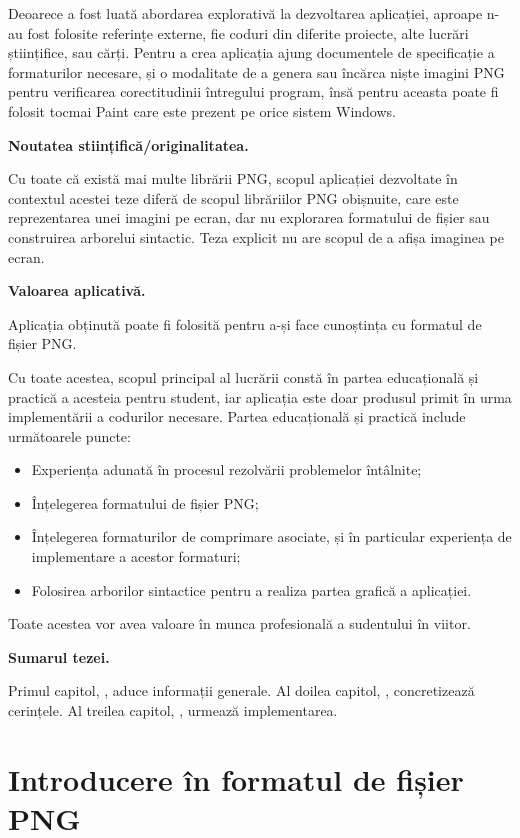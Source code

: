 \documentclass[a4paper,12pt]{report}
\begin{document}
Deoarece a fost luată abordarea explorativă la dezvoltarea aplicației,
aproape n-au fost folosite referințe externe,
fie coduri din diferite proiecte, alte lucrări științifice, sau cărți.
Pentru a crea aplicația ajung documentele de specificație a formaturilor necesare,
și o modalitate de a genera sau încărca niște imagini \ac{PNG}
pentru verificarea corectitudinii întregului program,
însă pentru aceasta poate fi folosit tocmai Paint care este prezent pe orice sistem Windows.

\textbf{Noutatea stiințifică/originalitatea.}

Cu toate că există mai multe librării \ac{PNG},
scopul aplicației dezvoltate în contextul acestei teze diferă de scopul librăriilor \ac{PNG} obișnuite,
care este reprezentarea unei imagini pe ecran,
dar nu explorarea formatului de fișier sau construirea arborelui sintactic.
Teza explicit nu are scopul de a afișa imaginea pe ecran.

\textbf{Valoarea aplicativă.}

Aplicația obținută poate fi folosită pentru a-și face cunoștința cu formatul de fișier \ac{PNG}.

Cu toate acestea, scopul principal al lucrării constă
în partea educațională și practică a acesteia pentru student,
iar aplicația este doar produsul primit în urma implementării a codurilor necesare.
Partea educațională și practică include următoarele puncte:
\begin{itemize}
    \item Experiența adunată în procesul rezolvării problemelor întâlnite;
    \item Înțelegerea formatului de fișier \ac{PNG};
    \item
        Înțelegerea formaturilor de comprimare asociate,
        și în particular experiența de implementare a acestor formaturi;
    \item Folosirea arborilor sintactice pentru a realiza partea grafică a aplicației.
\end{itemize}

Toate acestea vor avea valoare în munca profesională a sudentului în viitor.


\textbf{Sumarul tezei.}

Primul capitol, , aduce informații generale.
Al doilea capitol, , concretizează cerințele.
Al treilea capitol, , urmează implementarea.


\chapter{Introducere în formatul de fișier \ac{PNG}}\label{intro_chapter_title}
\end{document}
